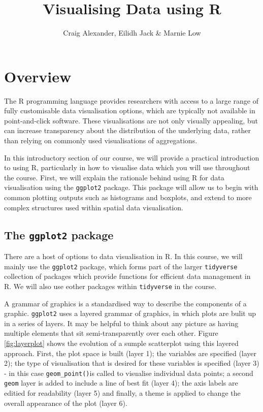\documentclass[
]{book}
\title{Visualising Data using R}
\author{Craig Alexander, Eilidh Jack \& Marnie Low}
\date{}
\begin{document}
\maketitle

{
\setcounter{tocdepth}{1}
\tableofcontents
}
\hypertarget{overview}{%
\chapter{Overview}\label{overview}}

The R programming language provides researchers with access to a large range of fully customisable data visualisation options, which are typically not available in point-and-click software. These visualisations are not only visually appealing, but can increase transparency about the distribution of the underlying data, rather than relying on commonly used visualisations of aggregations.

In this introductory section of our course, we will provide a practical introduction to using R, particularly in how to visualise data which you will use throughout the course. First, we will explain the rationale behind using R for data visualisation using the \texttt{ggplot2} package. This package will allow us to begin with common plotting outputs such as histograms and boxplots, and extend to more complex structures used within spatial data visualisation.

\hypertarget{the-ggplot2-package}{%
\section{\texorpdfstring{The \texttt{ggplot2} package}{The ggplot2 package}}\label{the-ggplot2-package}}

There are a host of options to data visualisation in R. In this course, we will mainly use the \texttt{ggplot2} package, which forms part of the larger \texttt{tidyverse} collection of packages which provide functions for efficient data management in R. We will also use eother packages within \texttt{tidyverse} in the course.

A grammar of graphics is a standardised way to describe the components of a graphic. \texttt{ggplot2} uses a layered grammar of graphics, in which plots are bulit up in a series of layers. It may be helpful to think about any picture as having multiple elements that sit semi-transparently over each other.
Figure \ref{fig:layerplot} shows the evolution of a sumple scatterplot using this layered approach. First, the plot space is built (layer 1); the variables are specified (layer 2); the type of visualisation that is desired for these variables is specified (layer 3) - in this case \texttt{geom\_point()}is called to visualise individual data points; a second \texttt{geom} layer is added to include a line of best fit (layer 4); the axis labels are editied for readability (layer 5) and finally, a theme is applied to change the overall appearance of the plot (layer 6).
\end{document}
